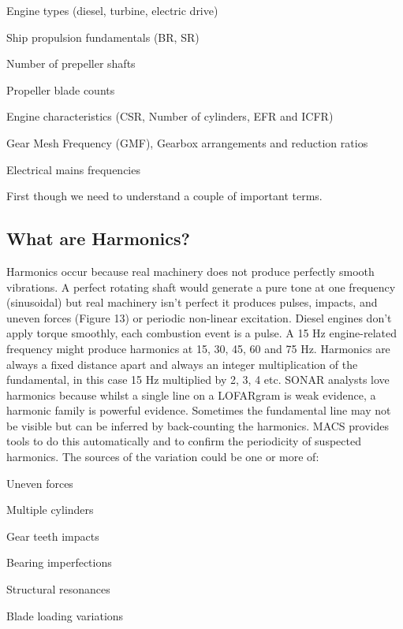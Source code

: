 \begin{compactitem}
    \item Engine types (diesel, turbine, electric drive)
    \item Ship propulsion fundamentals (BR, SR)
    \item Number of prepeller shafts
    \item Propeller blade counts
    \item Engine characteristics (CSR, Number of cylinders, EFR and ICFR)
    \item Gear Mesh Frequency (GMF), Gearbox arrangements and reduction ratios
    \item Electrical mains frequencies
\end{compactitem}

First though we need to understand a couple of important terms.

\subsection{What are Harmonics?}

Harmonics occur because real machinery does not produce perfectly smooth vibrations. A perfect rotating shaft would generate a pure tone at one frequency (sinusoidal) but real machinery isn't perfect it produces pulses, impacts, and uneven forces (Figure 13) or periodic non-linear excitation. Diesel engines don't apply torque smoothly, each combustion event is a pulse. A 15 Hz engine-related frequency might produce harmonics at 15, 30, 45, 60 and 75 Hz. Harmonics are always a fixed distance apart and always an integer multiplication of the fundamental, in this case 15 Hz multiplied by 2, 3, 4 etc. SONAR analysts love harmonics because whilst a single line on a LOFARgram is weak evidence, a harmonic family is powerful evidence. Sometimes the fundamental line may not be visible but can be inferred by back-counting the harmonics. MACS provides tools to do this automatically and to confirm the periodicity of suspected harmonics. The sources of the variation could be one or more of:

\begin{compactitem} 
    \item Uneven forces
    \item Multiple cylinders
    \item Gear teeth impacts
    \item Bearing imperfections
    \item Structural resonances
    \item Blade loading variations
\end{compactitem}

